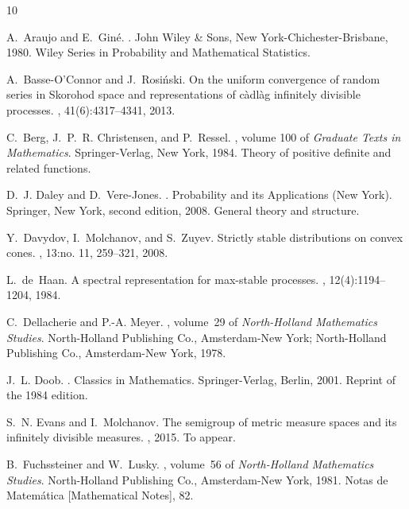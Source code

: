 \documentclass[12pt]{amsart}
\numberwithin{equation}{section}
\numberwithin{figure}{section}
\theoremstyle{plain} \newtheorem{theorem}{Theorem}[section]
\theoremstyle{plain} \newtheorem{proposition}[theorem]{Proposition}
\theoremstyle{plain} \newtheorem{lemma}[theorem]{Lemma}
\theoremstyle{plain} \newtheorem{corollary}[theorem]{Corollary}
\theoremstyle{definition} \newtheorem{definition}[theorem]{Definition}
\theoremstyle{definition} \newtheorem{notation}[theorem]{Notation}
\theoremstyle{remark} \newtheorem{remark}[theorem]{Remark}
\theoremstyle{remark} \newtheorem{example}[theorem]{Example}
\theoremstyle{definition} \newtheorem{assumption}{Assumption}
\begin{document}
\def\cprime{$'$}
\begin{thebibliography}{10}

A.~Araujo and E.~Gin{\'e}.
.
\newblock John Wiley \& Sons, New York-Chichester-Brisbane, 1980.
\newblock Wiley Series in Probability and Mathematical Statistics.

A.~Basse-O'Connor and J.~Rosi{\'n}ski.
\newblock On the uniform convergence of random series in {S}korohod space and
  representations of c\`adl\`ag infinitely divisible processes.
, 41(6):4317--4341, 2013.

C.~Berg, J.~P.~R. Christensen, and P.~Ressel.
, volume 100 of {\em Graduate
  Texts in Mathematics}.
\newblock Springer-Verlag, New York, 1984.
\newblock Theory of positive definite and related functions.

D.~J. Daley and D.~Vere-Jones.
.
\newblock Probability and its Applications (New York). Springer, New York,
  second edition, 2008.
\newblock General theory and structure.

Y.~Davydov, I.~Molchanov, and S.~Zuyev.
\newblock Strictly stable distributions on convex cones.
, 13:no. 11, 259--321, 2008.

L.~de~Haan.
\newblock A spectral representation for max-stable processes.
, 12(4):1194--1204, 1984.

C.~Dellacherie and P.-A. Meyer.
, volume~29 of {\em North-Holland
  Mathematics Studies}.
\newblock North-Holland Publishing Co., Amsterdam-New York; North-Holland
  Publishing Co., Amsterdam-New York, 1978.

J.~L. Doob.
.
\newblock Classics in Mathematics. Springer-Verlag, Berlin, 2001.
\newblock Reprint of the 1984 edition.

S.~N. Evans and I.~Molchanov.
\newblock The semigroup of metric measure spaces and its infinitely divisible
  measures.
, 2015.
\newblock To appear.

B.~Fuchssteiner and W.~Lusky.
, volume~56 of {\em North-Holland Mathematics
  Studies}.
\newblock North-Holland Publishing Co., Amsterdam-New York, 1981.
\newblock Notas de Matem{\'a}tica [Mathematical Notes], 82.


\end{thebibliography}
\end{document}
